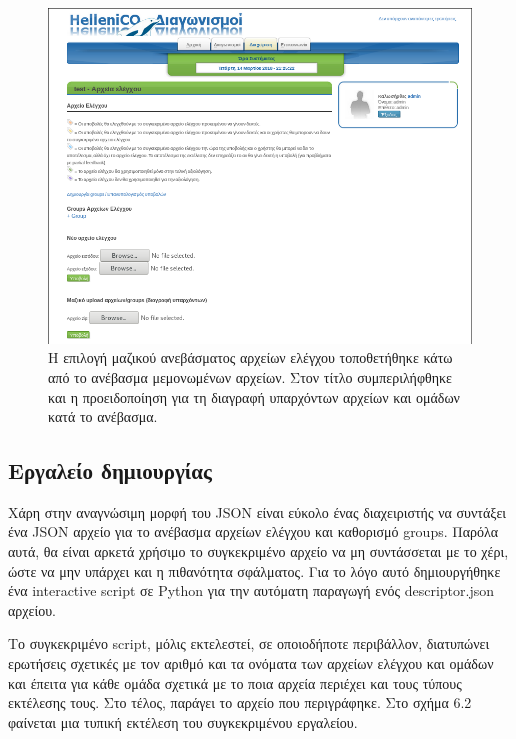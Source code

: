 \documentclass[diploma]{softlab-thesis}
\begin{document}
\FloatBarrier



\begin{figure}
  \centering
  \includegraphics[scale=0.5,trim=4 4 4 4,clip]{Figures/massupload.png}
  \caption[Προσθήκη επιλογής μαζικού ανεβάσματος αρχείων]{Η επιλογή μαζικού
  ανεβάσματος αρχείων ελέγχου τοποθετήθηκε κάτω από το ανέβασμα μεμονωμένων αρχείων.
  Στον τίτλο συμπεριλήφθηκε και η προειδοποίηση για τη διαγραφή υπαρχόντων αρχείων
  και ομάδων κατά το ανέβασμα.}
\end{figure}

\subsection{Εργαλείο δημιουργίας}

Χάρη στην αναγνώσιμη μορφή του JSON είναι εύκολο ένας διαχειριστής να συντάξει
ένα JSON αρχείο για το ανέβασμα αρχείων ελέγχου και καθορισμό groups. Παρόλα
αυτά, θα είναι αρκετά χρήσιμο το συγκεκριμένο αρχείο να μη συντάσσεται με το
χέρι, ώστε να μην υπάρχει και η πιθανότητα σφάλματος. Για το λόγο αυτό
δημιουργήθηκε ένα interactive script σε Python για την αυτόματη παραγωγή ενός
descriptor.json αρχείου.

\bigskip

Το συγκεκριμένο script, μόλις εκτελεστεί, σε οποιοδήποτε περιβάλλον, διατυπώνει
ερωτήσεις σχετικές με τον αριθμό και τα ονόματα των αρχείων ελέγχου και ομάδων
και έπειτα για κάθε ομάδα σχετικά με το ποια αρχεία περιέχει και τους τύπους
εκτέλεσης τους. Στο τέλος, παράγει το αρχείο που περιγράφηκε. Στο σχήμα 6.2
φαίνεται μια τυπική εκτέλεση του συγκεκριμένου εργαλείου.
\end{document}
